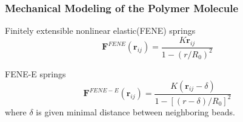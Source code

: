 \begin{frame}
  \frametitle{Mechanical Modeling of the Polymer Molecule}
Finitely extensible nonlinear elastic(FENE) springs
\begin{equation}\label{equ:fene}
 \mathbf{F}^{FENE}(\mathbf{r}_{ij})=\frac{K\mathbf{r}_{ij}}{1-(r/R_0)^2}
\end{equation}

FENE-E springs
  \begin{equation}\label{equ:feneE}
 \mathbf{F}^{FENE-E}(\mathbf{r}_{ij})=\frac{K(\mathbf{r}_{ij}-\delta)}{1-[(r-\delta)/R_0]^2}
\end{equation}
where $\delta$ is given minimal distance between neighboring beads.
\end{frame}

